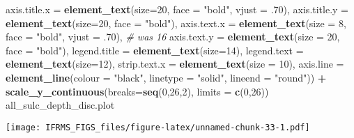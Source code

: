 \documentclass[
]{article}
\newenvironment{Shaded}{\begin{snugshade}}{\end{snugshade}}
\newcommand{\CommentTok}[1]{\textcolor[rgb]{0.56,0.35,0.01}{\textit{#1}}}
\newcommand{\DataTypeTok}[1]{\textcolor[rgb]{0.13,0.29,0.53}{#1}}
\newcommand{\DecValTok}[1]{\textcolor[rgb]{0.00,0.00,0.81}{#1}}
\newcommand{\FloatTok}[1]{\textcolor[rgb]{0.00,0.00,0.81}{#1}}
\newcommand{\KeywordTok}[1]{\textcolor[rgb]{0.13,0.29,0.53}{\textbf{#1}}}
\newcommand{\NormalTok}[1]{#1}
\newcommand{\OperatorTok}[1]{\textcolor[rgb]{0.81,0.36,0.00}{\textbf{#1}}}
\newcommand{\StringTok}[1]{\textcolor[rgb]{0.31,0.60,0.02}{#1}}
\begin{document}
\begin{Shaded}
\begin{Highlighting}[]
        \DataTypeTok{axis.title.x =} \KeywordTok{element_text}\NormalTok{(}\DataTypeTok{size=}\DecValTok{20}\NormalTok{, }\DataTypeTok{face =} \StringTok{"bold"}\NormalTok{, }\DataTypeTok{vjust =} \FloatTok{.70}\NormalTok{),}
        \DataTypeTok{axis.title.y =} \KeywordTok{element_text}\NormalTok{(}\DataTypeTok{size=}\DecValTok{20}\NormalTok{, }\DataTypeTok{face =} \StringTok{"bold"}\NormalTok{),}
        \DataTypeTok{axis.text.x =} \KeywordTok{element_text}\NormalTok{(}\DataTypeTok{size =} \DecValTok{8}\NormalTok{, }\DataTypeTok{face =} \StringTok{"bold"}\NormalTok{, }\DataTypeTok{vjust =} \FloatTok{.70}\NormalTok{), }\CommentTok{# was 16}
        \DataTypeTok{axis.text.y =} \KeywordTok{element_text}\NormalTok{(}\DataTypeTok{size =} \DecValTok{20}\NormalTok{, }\DataTypeTok{face =} \StringTok{"bold"}\NormalTok{),}
        \DataTypeTok{legend.title =} \KeywordTok{element_text}\NormalTok{(}\DataTypeTok{size=}\DecValTok{14}\NormalTok{), }
        \DataTypeTok{legend.text =} \KeywordTok{element_text}\NormalTok{(}\DataTypeTok{size=}\DecValTok{12}\NormalTok{),}
        \DataTypeTok{strip.text.x =} \KeywordTok{element_text}\NormalTok{(}\DataTypeTok{size =} \DecValTok{10}\NormalTok{), }
        \DataTypeTok{axis.line =} \KeywordTok{element_line}\NormalTok{(}\DataTypeTok{colour =} \StringTok{"black"}\NormalTok{, }\DataTypeTok{linetype =} \StringTok{"solid"}\NormalTok{, }\DataTypeTok{lineend =} \StringTok{"round"}\NormalTok{)) }\OperatorTok{+}
\StringTok{  }\KeywordTok{scale_y_continuous}\NormalTok{(}\DataTypeTok{breaks=}\KeywordTok{seq}\NormalTok{(}\DecValTok{0}\NormalTok{,}\DecValTok{26}\NormalTok{,}\DecValTok{2}\NormalTok{), }\DataTypeTok{limits =} \KeywordTok{c}\NormalTok{(}\DecValTok{0}\NormalTok{,}\DecValTok{26}\NormalTok{))}
\NormalTok{all_sulc_depth_disc.plot}
\end{Highlighting}
\end{Shaded}

\texttt{[image: IFRMS\_FIGS\_files/figure-latex/unnamed-chunk-33-1.pdf]}
\end{document}
